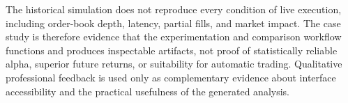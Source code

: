 The historical simulation does not reproduce every condition of live execution, including order-book depth, latency, partial fills, and market impact. The case study is therefore evidence that the experimentation and comparison workflow functions and produces inspectable artifacts, not proof of statistically reliable alpha, superior future returns, or suitability for automatic trading. Qualitative professional feedback is used only as complementary evidence about interface accessibility and the practical usefulness of the generated analysis.
